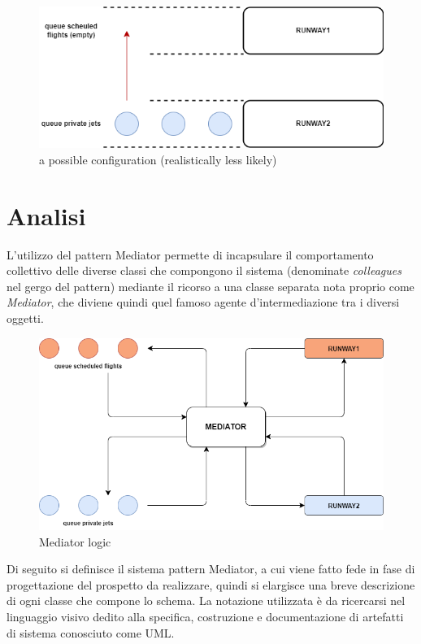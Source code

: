 \documentclass{article}
\begin{document}
\begin{sloppy}
\bigbreak


\begin{figure}[H]
    \centering
    \includegraphics[scale=0.5]{figure3.png}
    \caption{a possible configuration (realistically less likely)}
    \label{fig:enter-label}
\end{figure}

\section{Analisi}
L'utilizzo del pattern Mediator permette di incapsulare il comportamento collettivo delle diverse classi che compongono il sistema (denominate \textit{colleagues} nel gergo del pattern) mediante il ricorso a una classe separata nota proprio come \textit{Mediator}, che diviene quindi quel famoso agente d'intermediazione tra i diversi oggetti.

\bigbreak

\begin{figure}[H]
    \centering
    \includegraphics[scale=0.4]{figure4.png}
    \caption{Mediator logic}
    \label{fig:enter-label}
\end{figure}

\bigbreak
\bigbreak

Di seguito si definisce il sistema pattern Mediator, a cui viene fatto fede in fase di progettazione del prospetto da realizzare, quindi si elargisce una breve descrizione di ogni classe che compone lo schema. La notazione utilizzata è da ricercarsi nel linguaggio visivo dedito alla specifica, costruzione e documentazione di artefatti di sistema conosciuto come UML. 


\end{sloppy}
\end{document}
